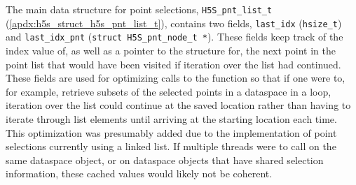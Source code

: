 \documentclass[../HDF5_RFC.tex]{subfiles}
\begin{document}
The main data structure for point selections, \texttt{H5S\_pnt\_list\_t}
(\ref{apdx:h5s_struct_h5s_pnt_list_t}), contains two fields, \texttt{last\_idx} (\texttt{hsize\_t})
and \texttt{last\_idx\_pnt} (\texttt{struct H5S\_pnt\_node\_t *}). These fields keep track of the
index value of, as well as a pointer to the structure for, the next point in the point list that
would have been visited if iteration over the list had continued. These fields are used for
optimizing calls to the  function so that if
one were to, for example, retrieve subsets of the selected points in a dataspace in a loop,
iteration over the list could continue at the saved location rather than having to iterate through
list elements until arriving at the starting location each time. This optimization was presumably
added due to the implementation of point selections currently using a linked list. If multiple
threads were to call  on the same dataspace
object, or on dataspace objects that have shared selection information, these cached values would
likely not be coherent.
\end{document}

